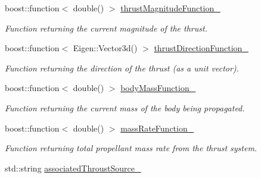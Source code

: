 \begin{DoxyCompactItemize}
\item 
boost\+::function$<$ double() $>$ \hyperlink{classtudat_1_1propulsion_1_1ThrustAcceleration_aadcc088dd4a38db8b8f67ed0853dcc29}{thrust\+Magnitude\+Function\+\_\+}
\begin{DoxyCompactList}\small\item\em Function returning the current magnitude of the thrust. \end{DoxyCompactList}\item 
boost\+::function$<$ Eigen\+::\+Vector3d() $>$ \hyperlink{classtudat_1_1propulsion_1_1ThrustAcceleration_addab21b2c71cc5aa71268590d076a653}{thrust\+Direction\+Function\+\_\+}
\begin{DoxyCompactList}\small\item\em Function returning the direction of the thrust (as a unit vector). \end{DoxyCompactList}\item 
boost\+::function$<$ double() $>$ \hyperlink{classtudat_1_1propulsion_1_1ThrustAcceleration_a3933986d39fc764eb2b9f3ce6ca9b842}{body\+Mass\+Function\+\_\+}\hypertarget{classtudat_1_1propulsion_1_1ThrustAcceleration_a3933986d39fc764eb2b9f3ce6ca9b842}{}\label{classtudat_1_1propulsion_1_1ThrustAcceleration_a3933986d39fc764eb2b9f3ce6ca9b842}

\begin{DoxyCompactList}\small\item\em Function returning the current mass of the body being propagated. \end{DoxyCompactList}\item 
boost\+::function$<$ double() $>$ \hyperlink{classtudat_1_1propulsion_1_1ThrustAcceleration_a40e4e949c17b0050e276c9a8c4e42026}{mass\+Rate\+Function\+\_\+}\hypertarget{classtudat_1_1propulsion_1_1ThrustAcceleration_a40e4e949c17b0050e276c9a8c4e42026}{}\label{classtudat_1_1propulsion_1_1ThrustAcceleration_a40e4e949c17b0050e276c9a8c4e42026}

\begin{DoxyCompactList}\small\item\em Function returning total propellant mass rate from the thrust system. \end{DoxyCompactList}\item 
std\+::string \hyperlink{classtudat_1_1propulsion_1_1ThrustAcceleration_a2ddb68ef5d71972f74d43d3d5c4f2e73}{associated\+Throust\+Source\+\_\+}\hypertarget{classtudat_1_1propulsion_1_1ThrustAcceleration_a2ddb68ef5d71972f74d43d3d5c4f2e73}{}\label{classtudat_1_1propulsion_1_1ThrustAcceleration_a2ddb68ef5d71972f74d43d3d5c4f2e73}


\end{DoxyCompactItemize}
